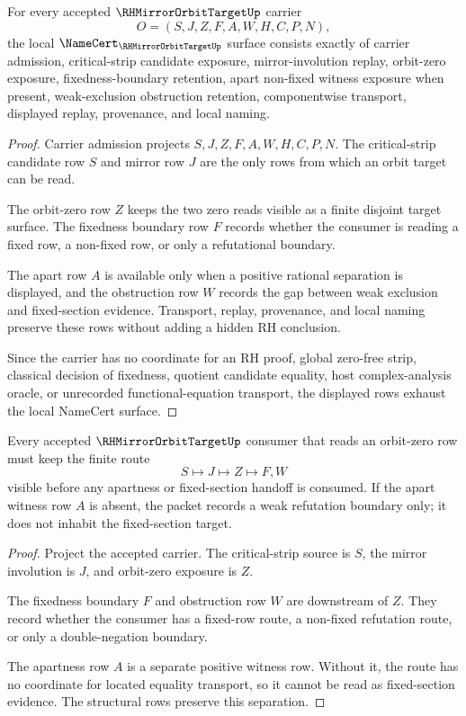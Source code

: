 \begin{theorem}
\label{thm:rh-mirror-orbit-target-namecert-obligations}
For every accepted $\RHMirrorOrbitTargetUp$ carrier
$$
O=(S,J,Z,F,A,W,H,C,P,N),
$$
the local $\NameCert_{\RHMirrorOrbitTargetUp}$ surface consists exactly of carrier admission, critical-strip candidate exposure, mirror-involution replay, orbit-zero exposure, fixedness-boundary retention, apart non-fixed witness exposure when present, weak-exclusion obstruction retention, componentwise transport, displayed replay, provenance, and local naming.
\end{theorem}
\begin{proof}
Carrier admission projects $S,J,Z,F,A,W,H,C,P,N$. The critical-strip candidate row $S$ and mirror row $J$ are the only rows from which an orbit target can be read.

The orbit-zero row $Z$ keeps the two zero reads visible as a finite disjoint target surface. The fixedness boundary row $F$ records whether the consumer is reading a fixed row, a non-fixed row, or only a refutational boundary.

The apart row $A$ is available only when a positive rational separation is displayed, and the obstruction row $W$ records the gap between weak exclusion and fixed-section evidence. Transport, replay, provenance, and local naming preserve these rows without adding a hidden RH conclusion.

Since the carrier has no coordinate for an RH proof, global zero-free strip, classical decision of fixedness, quotient candidate equality, host complex-analysis oracle, or unrecorded functional-equation transport, the displayed rows exhaust the local NameCert surface.
\end{proof}

\begin{theorem}
\label{thm:rh-mirror-orbit-target-fixedness-boundary}
Every accepted $\RHMirrorOrbitTargetUp$ consumer that reads an orbit-zero row must keep the finite route
$$
S \longmapsto J \longmapsto Z \longmapsto F,W
$$
visible before any apartness or fixed-section handoff is consumed. If the apart witness row $A$ is absent, the packet records a weak refutation boundary only; it does not inhabit the fixed-section target.
\end{theorem}
\begin{proof}
Project the accepted carrier. The critical-strip source is $S$, the mirror involution is $J$, and orbit-zero exposure is $Z$.

The fixedness boundary $F$ and obstruction row $W$ are downstream of $Z$. They record whether the consumer has a fixed-row route, a non-fixed refutation route, or only a double-negation boundary.

The apartness row $A$ is a separate positive witness row. Without it, the route has no coordinate for located equality transport, so it cannot be read as fixed-section evidence. The structural rows preserve this separation.
\end{proof}

